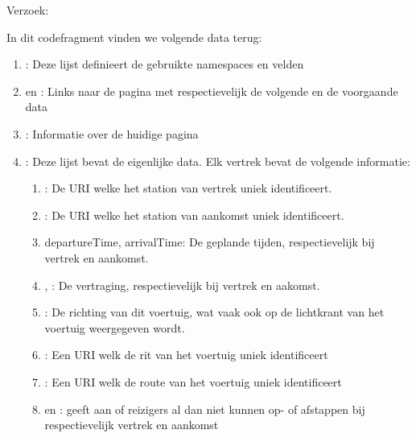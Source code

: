 Verzoek: 

In dit codefragment vinden we volgende data terug:
\begin{enumerate}
	\item {}: Deze lijst definieert de gebruikte namespaces en velden
	\item {} en  : Links naar de pagina met respectievelijk de volgende en de voorgaande data
	\item {}: Informatie over de huidige pagina
	\item {}: Deze lijst bevat de eigenlijke data. Elk vertrek bevat de volgende informatie:
	\begin{enumerate}
			\item {}: De URI welke het station van vertrek uniek identificeert.
			\item {}: De URI welke het station van aankomst uniek identificeert.	\item departureTime, arrivalTime: De geplande tijden, respectievelijk bij vertrek en aankomst.
			\item {}, : De vertraging, respectievelijk bij vertrek en aakomst.
			\item {}: De richting van dit voertuig, wat vaak ook op de lichtkrant van het voertuig weergegeven wordt.
			\item {}: Een URI welk de rit van het voertuig uniek identificeert
			\item {}: Een URI welk de route van het voertuig uniek identificeert
			\item {} en : geeft aan of reizigers al dan niet kunnen op- of afstappen bij respectievelijk vertrek en aankomst
	\end{enumerate}
\end{enumerate}

